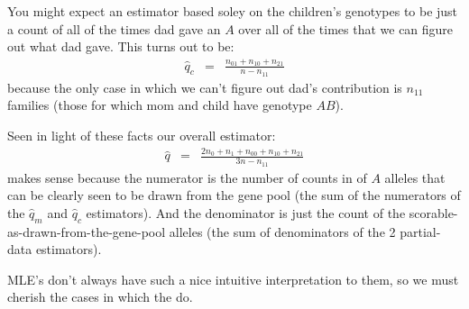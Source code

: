 \documentclass[11pt]{article}
\begin{document}
You might expect an estimator based soley on the children's genotypes to be just a count of all of the times
dad gave an $A$ over all of the times that we can figure out what dad gave.
This turns out to be:
\begin{eqnarray}
  \hat{q}_c & = & \frac{n_{01} + n_{10} + n_{21}}{n-n_{11}}
\end{eqnarray}
because the only case in which we can't figure out dad's contribution is $n_{11}$ families (those
for which mom and child have genotype $AB$).


Seen in light of these facts our overall estimator:
\begin{eqnarray}
\hat{q} & = & \frac{2n_0 + n_1 + n_{00} + n_{10} +n_{21}}{3n - n_{11}}  \nonumber
\end{eqnarray}
makes sense because the numerator is the number of counts in of $A$ alleles that can be clearly 
seen to be drawn from the gene pool (the sum of the numerators of the $ \hat{q}_m$ and $ \hat{q}_c$ estimators).
And the denominator is just the count of the scorable-as-drawn-from-the-gene-pool alleles (the sum of
denominators of the 2 partial-data estimators).

MLE's don't always have such a nice intuitive interpretation to them, so we must cherish the cases
in which the do.
\end{document}
